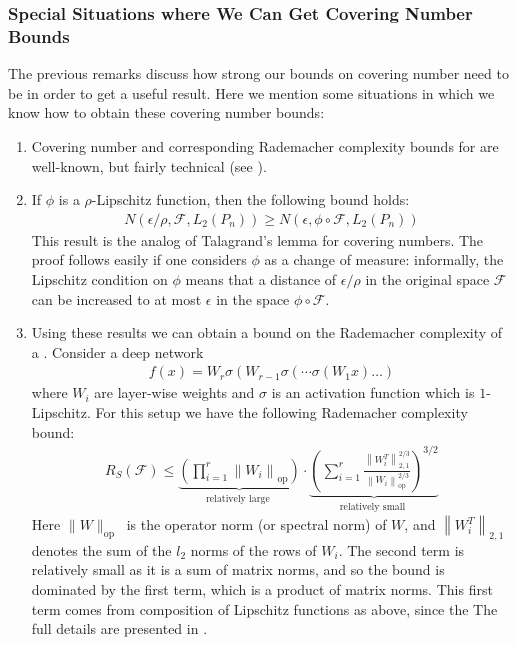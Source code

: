 \documentclass{article}
\begin{document}
\subsubsection{Special Situations where We Can Get Covering Number Bounds}
The previous remarks discuss how strong our bounds on covering number need to be in order to get a useful result. Here we mention some situations in which we know how to obtain these covering number bounds:
\begin{enumerate}
    \item Covering number and corresponding Rademacher complexity bounds for  are well-known, but fairly technical (see \cite{zhang2002covering}).
    \item {} If $\phi$ is a $\rho$-Lipschitz function, then the following bound holds:
\begin{align*}
N\left(\epsilon / \rho, \mathcal{F}, L_{2}\left(P_{n}\right)\right) \geq N\left(\epsilon, \phi \circ \mathcal{F}, L_{2}\left(P_{n}\right)\right)
\end{align*}
This result is the analog of Talagrand's lemma for covering numbers. The proof follows easily if one considers $\phi$ as a change of measure: informally, the Lipschitz condition on $\phi$ means that a distance of $\epsilon / \rho$ in the original space $\mathcal{F}$ can be increased to at most $\epsilon$ in the space $\phi \circ \mathcal{F}$.
\item Using these results we can obtain a bound on the Rademacher complexity of a . Consider a deep network
\begin{align*}
f(x)=W_{r} \sigma\left(W_{r-1} \sigma\left(\cdots \sigma\left(W_{1} x\right) \ldots\right)\right.
\end{align*}
where $W_{i}$ are layer-wise weights and $\sigma$ is an activation function which is $1$-Lipschitz. For this setup we have the following Rademacher complexity bound:
\begin{align*}
R_{S}(\mathcal{F}) \leq \underbrace{\left(\prod_{i=1}^{r}\left\|W_{i}\right\|_{\mathrm{op}}\right)}_{\text {relatively large }} \cdot \underbrace{\left(\sum_{i=1}^{r} \frac{\left\|W_{i}^{T}\right\|_{2,1}^{2 / 3}}{\left\|W_{i}\right\|_{\mathrm{op}}^{2 / 3}}\right)^{3 / 2}}_{\text {relatively small }}
\end{align*}
Here $\|W\|_{\text {op }}$ is the operator norm (or spectral norm) of $W$, and $\left\|W_{i}^{T}\right\|_{2,1}$ denotes the sum of the $l_{2}$ norms of the rows of $W_{i} .$ The second term is relatively small as it is a sum of matrix norms, and so the bound is dominated by the first term, which is a product of matrix norms. This first term comes from composition of Lipschitz functions as above, since the  The full details are presented in \cite{bartlett2017spectrally}.
\end{enumerate}
\end{document}
